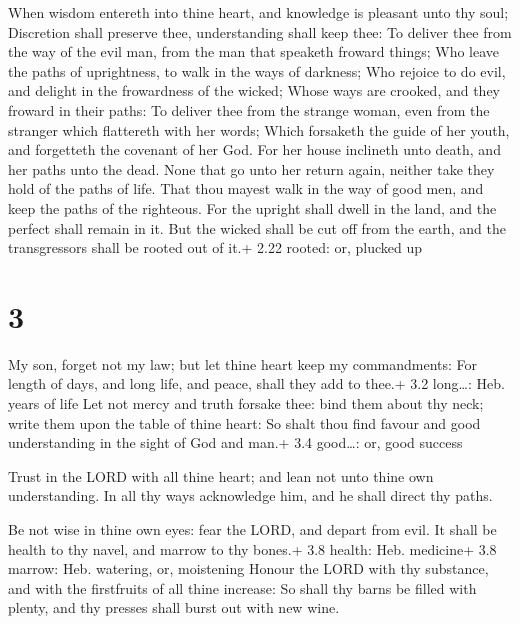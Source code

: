  When wisdom entereth into thine heart, and knowledge is
pleasant unto thy soul;  Discretion shall preserve thee,
understanding shall keep thee:  To deliver thee from the
way of the evil man, from the man that speaketh froward things;
 Who leave the paths of uprightness, to walk in the ways of
darkness;  Who rejoice to do evil, and delight in the
frowardness of the wicked;  Whose ways are crooked, and
they froward in their paths:  To deliver thee from the
strange woman, even from the stranger which flattereth with her words;
 Which forsaketh the guide of her youth, and forgetteth the
covenant of her God.  For her house inclineth unto death,
and her paths unto the dead.  None that go unto her return
again, neither take they hold of the paths of life.  That
thou mayest walk in the way of good men, and keep the paths of the
righteous.  For the upright shall dwell in the land, and
the perfect shall remain in it.  But the wicked shall be
cut off from the earth, and the transgressors shall be rooted out of
it.+ 2.22 rooted: or, plucked up

\hypertarget{section-2}{%
\section{3}\label{section-2}}

 My son, forget not my law; but let thine heart keep my
commandments:  For length of days, and long life, and peace,
shall they add to thee.+ 3.2 long\ldots: Heb. years of life 
Let not mercy and truth forsake thee: bind them about thy neck; write
them upon the table of thine heart:  So shalt thou find
favour and good understanding in the sight of God and man.+ 3.4
good\ldots: or, good success

 Trust in the LORD with all thine heart; and lean not unto
thine own understanding.  In all thy ways acknowledge him,
and he shall direct thy paths.

 Be not wise in thine own eyes: fear the LORD, and depart
from evil.  It shall be health to thy navel, and marrow to
thy bones.+ 3.8 health: Heb. medicine+ 3.8 marrow: Heb. watering, or,
moistening  Honour the LORD with thy substance, and with the
firstfruits of all thine increase:  So shall thy barns be
filled with plenty, and thy presses shall burst out with new wine.

